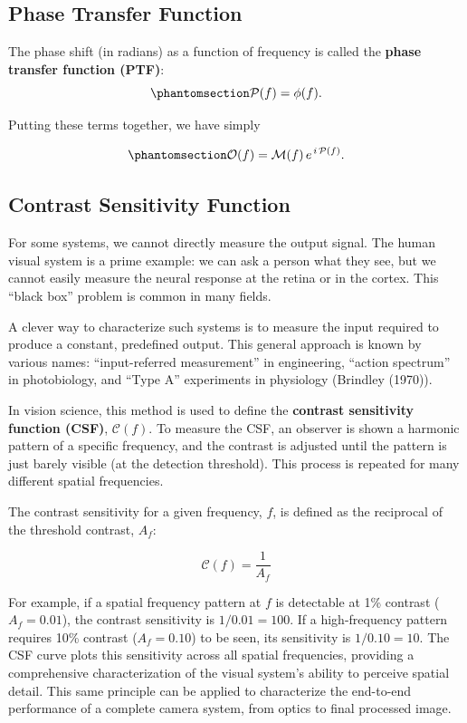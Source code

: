 \documentclass[
  letterpaper,
]{book}
\begin{document}
\subsection{Phase Transfer Function}\label{sec-PTF}

The phase shift (in radians) as a function of frequency is called the
\textbf{phase transfer function (PTF)}:
\begin{equation}\phantomsection\label{eq-phasetransform-definition}{
\mathcal{P}(f) = \phi(f).
}\end{equation}

Putting these terms together, we have simply

\begin{equation}\phantomsection\label{eq-otf-ptf-mtf}{
\mathcal{O}(f) 
= \mathcal{M}(f) \, e^{\,i \, \mathcal{P}(f)} .
}\end{equation}

\subsection{Contrast Sensitivity Function}\label{sec-CSF}

For some systems, we cannot directly measure the output signal. The
human visual system is a prime example: we can ask a person what they
see, but we cannot easily measure the neural response at the retina or
in the cortex. This ``black box'' problem is common in many fields.

A clever way to characterize such systems is to measure the input
required to produce a constant, predefined output. This general approach
is known by various names: ``input-referred measurement'' in
engineering, ``action spectrum'' in photobiology, and ``Type A''
experiments in physiology (Brindley (1970)).

In vision science, this method is used to define the \textbf{contrast
sensitivity function (CSF)}, \(\mathscr{C}(f)\). To measure the CSF, an
observer is shown a harmonic pattern of a specific frequency, and the
contrast is adjusted until the pattern is just barely visible (at the
detection threshold). This process is repeated for many different
spatial frequencies.

The contrast sensitivity for a given frequency, \(f\), is defined as the
reciprocal of the threshold contrast, \(A_{f}\):

\[
\mathscr{C}(f) = \frac{1}{A_{f}}
\]

For example, if a spatial frequency pattern at \(f\) is detectable at
1\% contrast (\(A_f=0.01\)), the contrast sensitivity is
\(1/0.01 = 100\). If a high-frequency pattern requires 10\% contrast
(\(A_f = 0.10\)) to be seen, its sensitivity is \(1/0.10 = 10\). The CSF
curve plots this sensitivity across all spatial frequencies, providing a
comprehensive characterization of the visual system's ability to
perceive spatial detail. This same principle can be applied to
characterize the end-to-end performance of a complete camera system,
from optics to final processed image.
\end{document}
